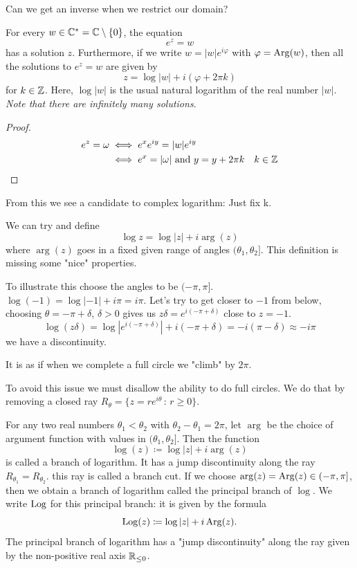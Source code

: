 \documentclass[10pt, a4paper]{article}
\begin{document}
Can we get an inverse when we restrict our domain?

\begin{lemma}
    For every $w \in \mathbb{C} ^ {*} = \mathbb{C} \setminus \{0\}$,
    the equation
    \[
    e ^ z = w
    \]
    has a solution $z$.
    Furthermore,
    if we write $w = |w|e ^ {i\varphi}$ with $\varphi = \operatorname{Arg}(w)$,
    then all the solutions to $e ^ z = w$ are given by
    \[
    z = \log|w| + i(\varphi + 2\pi k)
    \]
    for $k \in \mathbb{Z}$.
    Here,
    $\log|w|$ is the usual natural logarithm of the real number $|w|$.
    \textit{Note that there are infinitely many solutions}.

    \begin{proof}
        \begin{align*}
            e ^ z = \omega &\iff e ^ xe ^ {iy} = |w|e ^ {iy} \\
            &\iff e ^ x = |\omega|\text{ and } y = y + 2\pi k\quad k \in \mathbb{Z}
        \end{align*}
        \[
        \]
    \end{proof}
\end{lemma}

From this we see a candidate to complex logarithm:
Just fix k.

We can try and define
\[
\log{z} = \log|z| + i\arg(z)
\]
where $\arg(z)$ goes in a fixed given range of angles $(\theta_1, \theta_2]$.
This definition is missing some
"nice"
properties.

To illustrate this choose the angles to be $(-\pi, \pi]$.
$\log(-1) = \log|-1| + i\pi = i\pi$.
Let's try to get closer to $-1$ from below,
choosing $\theta = -\pi + \delta$,
$\delta > 0$ gives us $z\delta = e ^ {i(-\pi + \delta)}$ close to $z = -1$.
\[
\log(z\delta) = \log\left|e ^ {i(-\pi + \delta)}\right| + i(-\pi + \delta) = -i(\pi - \delta) \approx -i\pi
\]
we have a discontinuity.

It is as if when we complete a full circle we
"climb"
by $2\pi$.

To avoid this issue we must disallow the ability to do full circles.
We do that by removing a closed ray $R_{\theta} = \{z = re ^ {i\theta}\,:\,r \geq 0\}$.

\begin{definition}
    For any two real numbers $\theta_1 < \theta_2$ with $\theta_2 - \theta_1 = 2\pi$,
    let $\arg$ be the choice of argument function with values in $(\theta_1, \theta_2]$.
    Then the function
    \[
    \log(z) \coloneqq \log|z| + i\arg(z)
    \]
    is called a branch of logarithm.
    It has a jump discontinuity along the ray $R_{\theta_1} = R_{\theta_2}$.
    this ray is called a branch cut.
    If we choose $\arg(z) = \operatorname{Arg}(z) \in (-\pi, \pi]$,
    then we obtain a branch of logarithm called the principal branch of $\log$.
    We write $\operatorname{Log}$ for this principal branch:
    it is given by the formula
    \[
    \operatorname{Log}(z) \coloneqq \log|z| + i\operatorname{Arg}(z).
    \]
    The principal branch of logarithm has a
    "jump discontinuity"
    along the ray given by the non-positive real axis $\mathbb{R}_{\leq 0}$.
\end{definition}
\end{document}
